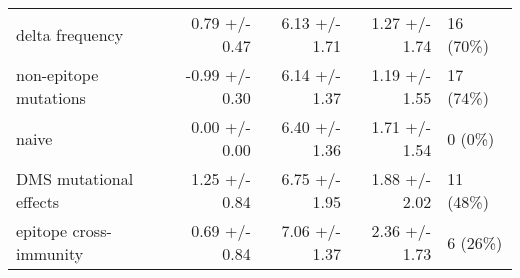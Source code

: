 \begin{tabular*}{1.0\textwidth}{lrrrl}
                   delta frequency &   0.79 +/- 0.47 &                          6.13 +/- 1.71 &                                   1.27 +/- 1.74 &                               16 (70\%) \\
             non-epitope mutations &  -0.99 +/- 0.30 &                          6.14 +/- 1.37 &                                   1.19 +/- 1.55 &                               17 (74\%) \\
                             naive &   0.00 +/- 0.00 &                          6.40 +/- 1.36 &                                   1.71 +/- 1.54 &                                 0 (0\%) \\
            DMS mutational effects &   1.25 +/- 0.84 &                          6.75 +/- 1.95 &                                   1.88 +/- 2.02 &                               11 (48\%) \\
            epitope cross-immunity &   0.69 +/- 0.84 &                          7.06 +/- 1.37 &                                   2.36 +/- 1.73 &                                6 (26\%) \\
\bottomrule
\end{tabular*}
